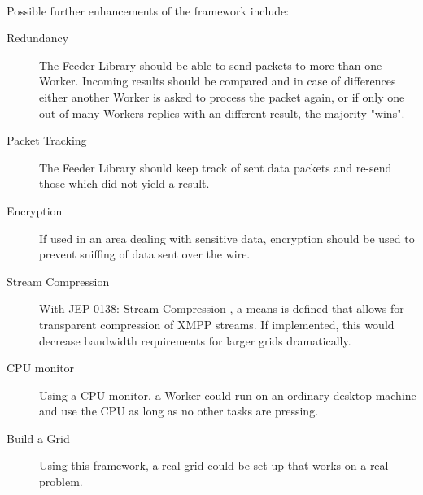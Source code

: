\paragraph{}
Possible further enhancements of the framework include:
\begin{description}
\item[Redundancy] The Feeder Library should be able to send packets to more than one Worker. Incoming results should be compared and in case of differences either another Worker is asked to process the packet again, or if only one out of many Workers replies with an different result, the majority "wins".
\item[Packet Tracking] The Feeder Library should keep track of sent data packets and re-send those which did not yield a result.
\item[Encryption] If used in an area dealing with sensitive data, encryption should be used to prevent sniffing of data sent over the wire.
\item[Stream Compression] With JEP-0138: Stream Compression \cite{jep0138}, a means is defined that allows for transparent compression of XMPP streams. If implemented, this would decrease bandwidth requirements for larger grids dramatically.
\item[CPU monitor] Using a CPU monitor, a Worker could run on an ordinary desktop machine and use the CPU as long as no other tasks are pressing.
\item[Build a Grid] Using this framework, a real grid could be set up that works on a real problem.
\end{description}
